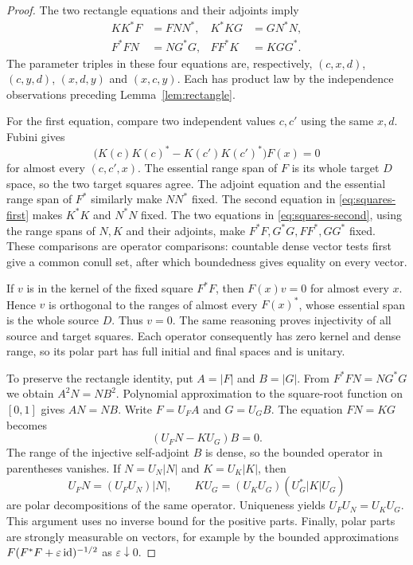 \begin{proof}
The two rectangle equations and their adjoints imply
\begin{align}
 KK^*F&=FNN^*,& K^*KG&=GN^*N,\label{eq:squares-first}\\
 F^*FN&=NG^*G,& FF^*K&=KGG^*.
 \label{eq:squares-second}
\end{align}
The parameter triples in these four equations are, respectively,
$(c,x,d)$, $(c,y,d)$, $(x,d,y)$ and $(x,c,y)$.  Each has product law by
the independence observations preceding Lemma~\ref{lem:rectangle}.

For the first equation, compare two independent values $c,c'$ using the
same $x,d$.  Fubini gives
\[
 \bigl(K(c)K(c)^*-K(c')K(c')^*\bigr)F(x)=0
\]
for almost every $(c,c',x)$.  The essential range span of $F$ is its whole
target $D$ space, so the two target squares agree.  The adjoint equation
and the essential range span of $F^*$ similarly make $NN^*$ fixed.
The second equation in \eqref{eq:squares-first} makes $K^*K$ and $N^*N$
fixed.  The two equations in \eqref{eq:squares-second}, using the range
spans of $N,K$ and their adjoints, make $F^*F,G^*G,FF^*,GG^*$ fixed.
These comparisons are operator comparisons: countable dense vector tests
first give a common conull set, after which boundedness gives equality
on every vector.

If $v$ is in the kernel of the fixed square $F^*F$, then $F(x)v=0$ for
almost every $x$.  Hence $v$ is orthogonal to the ranges of almost every
$F(x)^*$, whose essential span is the whole source $D$.  Thus $v=0$.
The same reasoning proves injectivity of all source and target squares.
Each operator consequently has zero kernel and dense range, so its polar
part has full initial and final spaces and is unitary.

To preserve the rectangle identity, put $A=|F|$ and $B=|G|$.  From
$F^*FN=NG^*G$ we obtain $A^2N=NB^2$.  Polynomial approximation to the
square-root function on $[0,1]$ gives $AN=NB$.  Write $F=U_FA$ and
$G=U_GB$.  The equation $FN=KG$ becomes
\[
 (U_FN-KU_G)B=0.
\]
The range of the injective self-adjoint $B$ is dense, so the bounded
operator in parentheses vanishes.  If $N=U_N|N|$ and $K=U_K|K|$, then
\[
 U_FN=(U_FU_N)|N|,\qquad
 KU_G=(U_KU_G)(U_G^*|K|U_G)
\]
are polar decompositions of the same operator.  Uniqueness yields
$U_FU_N=U_KU_G$.  This argument uses no inverse bound for the positive
parts.  Finally, polar parts are strongly measurable on vectors, for
example by the bounded approximations
$F(F^*F+\varepsilon\operatorname{id})^{-1/2}$ as $\varepsilon\downarrow0$.
\end{proof}

